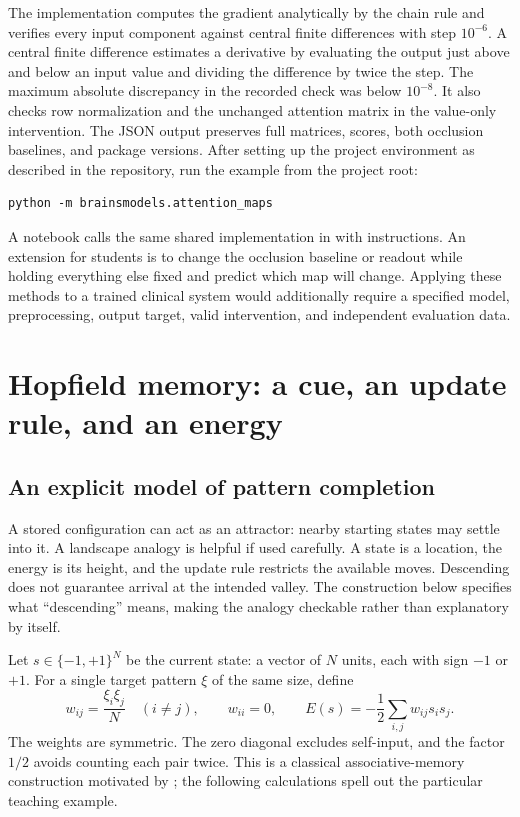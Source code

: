 The implementation computes the gradient analytically by the chain rule and verifies every input component against central finite differences with step $10^{-6}$. A central finite difference estimates a derivative by evaluating the output just above and below an input value and dividing the difference by twice the step. The maximum absolute discrepancy in the recorded check was below $10^{-8}$. It also checks row normalization and the unchanged attention matrix in the value-only intervention. The JSON output preserves full matrices, scores, both occlusion baselines, and package versions. After setting up the project environment as described in the repository, run the example from the project root:
\begin{verbatim}
python -m brainsmodels.attention_maps
\end{verbatim}
A notebook calls the same shared implementation in  with instructions. An extension for students is to change the occlusion baseline or readout while holding everything else fixed and predict which map will change. Applying these methods to a trained clinical system would additionally require a specified model, preprocessing, output target, valid intervention, and independent evaluation data.


\section{Hopfield memory: a cue, an update rule, and an energy}\label{app:hopfield}
\subsection{An explicit model of pattern completion}
A stored configuration can act as an attractor: nearby starting states may settle into it. A landscape analogy is helpful if used carefully. A state is a location, the energy is its height, and the update rule restricts the available moves. Descending does not guarantee arrival at the intended valley. The construction below specifies what ``descending'' means, making the analogy checkable rather than explanatory by itself.

Let $s\in\{-1,+1\}^{N}$ be the current state: a vector of $N$ units, each with sign $-1$ or $+1$. For a single target pattern $\xi$ of the same size, define
\begin{equation}
w_{ij}=\frac{\xi_i\xi_j}{N}\quad(i\ne j),\qquad w_{ii}=0,
\qquad E(s)=-\frac12\sum_{i,j}w_{ij}s_i s_j.
\end{equation}
The weights are symmetric. The zero diagonal excludes self-input, and the factor $1/2$ avoids counting each pair twice. This is a classical associative-memory construction motivated by \citet{hopfield1982}; the following calculations spell out the particular teaching example.

